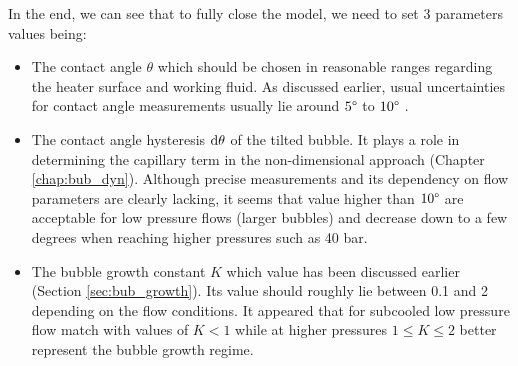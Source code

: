 \npar


In the end, we can see that to fully close the model, we need to set 3 parameters values being:

\begin{itemize}
\item The contact angle $\theta$ which should be chosen in reasonable ranges regarding the heater surface and working fluid. As discussed earlier, usual uncertainties for contact angle measurements usually lie around $5\degree$ to $10\degree$ \cite{guan_bubble_2015}.

\item The contact angle hysteresis $\mathrm{d}\theta$ of the tilted bubble. It plays a role in determining the capillary term in the non-dimensional approach (Chapter \ref{chap:bub_dyn}). Although precise measurements and its dependency on flow parameters are clearly lacking, it seems that value higher than $10 \degree$ are acceptable for low pressure flows (larger bubbles) and decrease down to a few degrees when reaching higher pressures such as 40 bar.

\item The bubble growth constant $K$ which value has been discussed earlier (Section \ref{sec:bub_growth}). Its value should roughly lie between 0.1 and 2 depending on the flow conditions. It appeared that for subcooled low pressure flow match with values of $K < 1$ while at higher pressures $1 \leq K \leq 2$ better represent the bubble growth regime.
\end{itemize}




